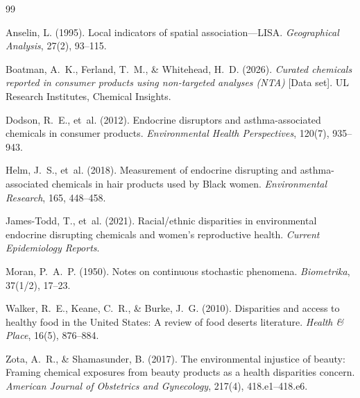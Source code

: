 \documentclass[12pt,letterpaper]{article}
\begin{document}

\begin{thebibliography}{99}

 Anselin, L. (1995). Local indicators of
spatial association---LISA. \textit{Geographical Analysis}, 27(2), 93--115.

 Boatman, A.~K., Ferland, T.~M., \&
Whitehead, H.~D. (2026). \textit{Curated chemicals reported in consumer products
using non-targeted analyses (NTA)} [Data set]. UL Research Institutes, Chemical
Insights.

 Dodson, R.~E., et~al. (2012). Endocrine
disruptors and asthma-associated chemicals in consumer products.
\textit{Environmental Health Perspectives}, 120(7), 935--943.

 Helm, J.~S., et~al. (2018). Measurement of
endocrine disrupting and asthma-associated chemicals in hair products used by
Black women. \textit{Environmental Research}, 165, 448--458.

 James-Todd, T., et~al. (2021).
Racial/ethnic disparities in environmental endocrine disrupting chemicals and
women's reproductive health. \textit{Current Epidemiology Reports}.

 Moran, P.~A.~P. (1950). Notes on continuous
stochastic phenomena. \textit{Biometrika}, 37(1/2), 17--23.

 Walker, R.~E., Keane, C.~R., \&
Burke, J.~G. (2010). Disparities and access to healthy food in the United States:
A review of food deserts literature. \textit{Health \& Place}, 16(5), 876--884.

 Zota, A.~R., \& Shamasunder, B.
(2017). The environmental injustice of beauty: Framing chemical exposures from
beauty products as a health disparities concern. \textit{American Journal of
Obstetrics and Gynecology}, 217(4), 418.e1--418.e6.

\end{thebibliography}
\end{document}
